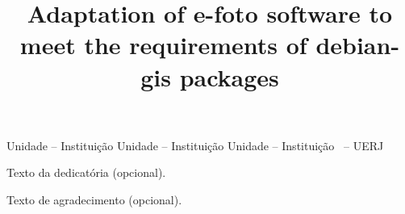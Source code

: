 \documentclass[a4paper,12pt,oneside,onecolumn,final,fleqn]{repUERJ}
\title{Adaptation of e-foto software to meet the requirements of debian-gis packages}
\begin{document}
	
	\frontmatter %
	
	\capa
	\folhaderosto
	\fichacatalografica{}
	\begin{folhadeaprovacao}
		{Unidade -- Instituição}
		{Unidade -- Instituição}
		{Unidade -- Instituição}
		{\UERJunidade \UERJunidadenome\ -- UERJ}
	\end{folhadeaprovacao}
	\vfill
	Texto da dedicatória (opcional).
	
	Texto de agradecimento (opcional).
	\pretextualchapter{}
	\vfill
	
\end{document}
